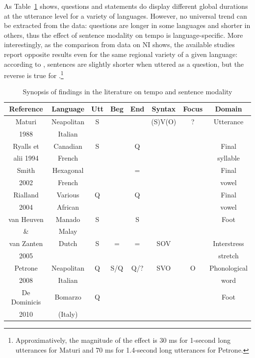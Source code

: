 As Table~\ref{tab41} shows, questions and statements do display different global durations at the utterance level for a variety of languages. However, no universal trend can be extracted from the data: questions are longer in some languages and shorter in others, thus the effect of sentence modality on tempo is language-specific. More interestingly, as the comparison from data on NI shows, the available studies report opposite results even for the same regional variety of a given language: according to \citet[table 6]{maturi1988intonazione}, sentences are slightly shorter when uttered as a question, but the reverse is true for \citet[163]{petrone2008role}.\footnote{Approximatively, the magnitude of the effect is 30 ms for 1-second long utterances for Maturi and 70 ms for 1.4-second long utterances for Petrone.} 

\begin{landscape}
\begin{table}[p]
\centering
\begin{tabular}{c c c c c c c c}
\mytoprule
Reference & Language & Utt & Beg & End & Syntax & Focus & Domain \\
\midrule\midrule
Maturi & Neapolitan & S & & & (S)V(O) & ? & Utterance\\
1988 & Italian & & & & & & \\
\midrule
Ryalls et & Canadian & S & & Q & & & Final \\
alii 1994 & French & & & & & & syllable \\
\midrule
Smith & Hexagonal & & & = & & & Final \\
2002 & French & & & & & & vowel \\
\midrule
Rialland & Various & Q & & Q & & & Final \\
2004 & African & & & & & & vowel \\
\midrule
van Heuven & Manado & S & & S & & & Foot \\
\& & Malay & & & & & & \\
van Zanten & Dutch & S & = & = & SOV & & Interstress \\
2005 & & & & & & & stretch \\
\midrule
Petrone & Neapolitan & Q & S/Q & Q/? & SVO & O & Phonological \\
2008 & Italian & & & & & & word \\
\midrule
De Dominicis & Bomarzo & Q & & & & & Foot \\
2010 & (Italy) & & & & & & \\
\end{tabular}
\caption{Synopsis of findings in the literature on tempo and sentence modality}
\label{tab41}\end{table}
\end{landscape}

